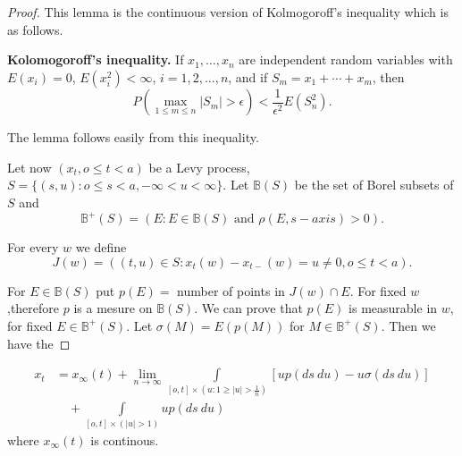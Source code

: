 \begin{proof}
This lemma is the continuous version of Kolmogoroff's inequality
which is as follows. 

\medskip
\noindent 
\textbf{Kolomogoroff's inequality.} If $x_1, \ldots , x_n$ are
independent random variables with $E(x_i) =0$, $E(x^2_i) < \infty$,
$i=1,2, \ldots , n$, and if $S_m = x_1 + \cdots + x_m$, then 
$$
P\left(\max_{1 \le m \le n}|S_m| >  \epsilon \right)<
\frac{1}{\epsilon^2} E(S^2_n). 
$$
 
The lemma follows easily from this inequality.

Let now $(x_t, o \leq t < a)$ be a Levy process, $S= \{ (s, u): o \leq
s < a, - \infty < u < \infty \}$. Let $\mathbb{B}(S)$ be the set of
Borel subsets of $S$ and   
$$
\mathbb{B}^+ (S) = (E : E \in \mathbb{B}(S) \text{\ and\ } \rho (E, s
- axis) >0) . 
$$ 
 
For every $w$ we define
$$
J(w) = ((t, u)  \in S : x_{t}(w) - x_{t-}(w) = u \neq 0, o \leq t < a).
$$

For $E \in \mathbb{B}(S)$ put $p(E)=$ number of points in $J(w) \cap
E$. For fixed $w$,\pageoriginale therefore $p$ is a mesure on
$\mathbb{B}(S)$. We 
can prove that $p(E)$ is measurable in $w$, for fixed $E \in
\mathbb{B}^+ (S)$. Let $\sigma (M) = E (p(M))$ for $M \in
\mathbb{B}^+(S)$. Then we have the
\end{proof}

\begin{theorem*}
\begin{align*}
x_t &= x_\infty (t)  + \lim_{n \to \infty} \int\limits_{[o,t] \times  (u:1 \ge
    |u  |  > \frac{1}{n})} [u p (ds\ du) -  u \sigma  (ds\ du) ]\\
&\quad  +
  \int\limits_{[o,t] \times (| u | > 1)}up(ds\ du) 
\end{align*}
where $x_\infty (t)$ is continous.
\end{theorem*}  

